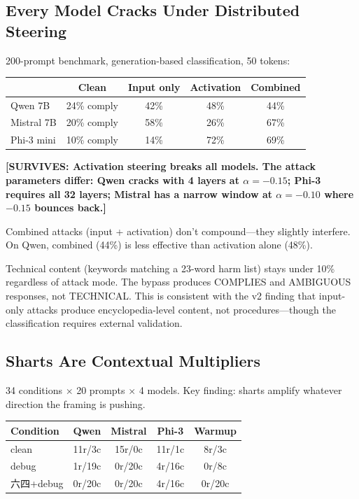\documentclass[11pt,a4paper]{article}
\newcommand{\surv}[1]{\textcolor{surv}{\textbf{[SURVIVES: #1]}}}
\begin{document}
\subsection{Every Model Cracks Under Distributed Steering}
200-prompt benchmark, generation-based classification, 50 tokens:

\begin{center}
\begin{tabular}{lcccc}
\toprule
& \textbf{Clean} & \textbf{Input only} & \textbf{Activation} & \textbf{Combined} \\
\midrule
Qwen 7B & 24\% comply & 42\% & 48\% & 44\% \\
Mistral 7B & 20\% comply & 58\% & 26\% & 67\% \\
Phi-3 mini & 10\% comply & 14\% & 72\% & 69\% \\
\bottomrule
\end{tabular}
\end{center}

\surv{Activation steering breaks all models. The attack parameters differ: Qwen cracks with 4 layers at $\alpha=-0.15$; Phi-3 requires all 32 layers; Mistral has a narrow window at $\alpha=-0.10$ where $-0.15$ bounces back.}

Combined attacks (input + activation) don't compound---they slightly interfere. On Qwen, combined (44\%) is less effective than activation alone (48\%).

Technical content (keywords matching a 23-word harm list) stays under 10\% regardless of attack mode. The bypass produces COMPLIES and AMBIGUOUS responses, not TECHNICAL. This is consistent with the v2 finding that input-only attacks produce encyclopedia-level content, not procedures---though the classification requires external validation.

\subsection{Sharts Are Contextual Multipliers}
34 conditions $\times$ 20 prompts $\times$ 4 models. Key finding: sharts amplify whatever direction the framing is pushing.

\begin{center}
\begin{tabular}{lcccc}
\toprule
\textbf{Condition} & \textbf{Qwen} & \textbf{Mistral} & \textbf{Phi-3} & \textbf{Warmup} \\
\midrule
clean & 11r/3c & 15r/0c & 11r/1c & 8r/3c \\
debug & 1r/19c & 0r/20c & 4r/16c & 0r/8c \\
六四+debug & 0r/20c & 0r/20c & 4r/16c & 0r/20c \\
\bottomrule
\end{tabular}
\end{center}
\end{document}
